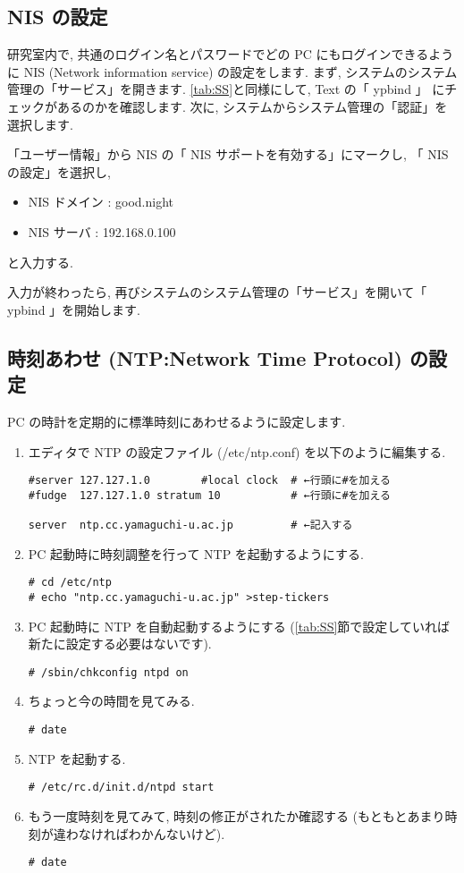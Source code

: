 \documentclass{jarticle}
\begin{document}
\subsection{NIS の設定}
研究室内で, 共通のログイン名とパスワードでどの PC にもログインできるよう
に NIS (Network information service) の設定をします.
まず, システムのシステム管理の「サービス」を開きます. \ref{tab:SS}と同様にして, Text の「 ypbind 」
にチェックがあるのかを確認します.
次に, システムからシステム管理の「認証」を選択します.

「ユーザー情報」から NIS の「 NIS サポートを有効する」にマークし, 「 NIS の設定」を選択し,
\begin{itemize}
	\item NIS ドメイン : good.night
	\item NIS サーバ : 192.168.0.100
\end{itemize}
と入力する.

入力が終わったら, 再びシステムのシステム管理の「サービス」を開いて「 ypbind 」を開始します.



\subsection{時刻あわせ (NTP:Network Time Protocol) の設定}

PC の時計を定期的に標準時刻にあわせるように設定します.
\begin{enumerate}
	\item エディタで NTP の設定ファイル (/etc/ntp.conf) を以下のように編集する.
\begin{verbatim}
#server 127.127.1.0        #local clock  # ←行頭に#を加える
#fudge  127.127.1.0 stratum 10           # ←行頭に#を加える

server  ntp.cc.yamaguchi-u.ac.jp         # ←記入する
\end{verbatim}
	\item PC 起動時に時刻調整を行って NTP を起動するようにする.
\begin{verbatim}
# cd /etc/ntp
# echo "ntp.cc.yamaguchi-u.ac.jp" >step-tickers
\end{verbatim}
	\item PC 起動時に NTP を自動起動するようにする
	      (\ref{tab:SS}節で設定していれば新たに設定する必要はないです).
\begin{verbatim}
# /sbin/chkconfig ntpd on
\end{verbatim}
	\item ちょっと今の時間を見てみる.
\begin{verbatim}
# date
\end{verbatim}
	\item NTP を起動する.
\begin{verbatim}
# /etc/rc.d/init.d/ntpd start
\end{verbatim}
	\item もう一度時刻を見てみて, 時刻の修正がされたか確認する
	      (もともとあまり時刻が違わなければわかんないけど).
\begin{verbatim}
# date
\end{verbatim}
\end{enumerate}
\end{document}
